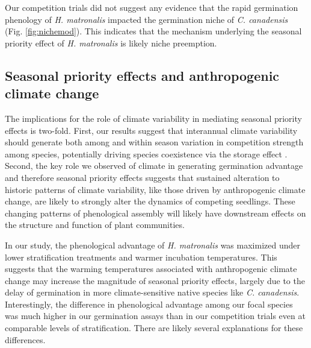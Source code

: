 \documentclass{article}[11pt]
\begin{document}
Our competition trials did not suggest any evidence that the rapid germination phenology of \textit{H. matronalis} impacted the germination niche of \textit{C. canadensis} (Fig. \ref{fig:nichemod}). This indicates that the mechanism underlying the seasonal priority effect of \textit{H. matronalis} is likely niche preemption.%

\subsection*{Seasonal priority effects and anthropogenic climate change}
The implications for the role of climate variability in mediating seasonal priority effects is two-fold. First, our results suggest that interannual climate variability should generate both among and within season variation in competition strength among species, potentially driving species coexistence via the storage effect \citep{Chesson:2003ve}. Second, the key role we observed of climate in generating germination advantage and therefore seasonal priority effects suggests that sustained alteration to historic patterns of climate variability, like those driven by anthropogenic climate change, are likely to strongly alter the dynamics of competing seedlings. These changing patterns of phenological assembly will likely have downstream effects on the structure and function of plant communities.

In our study, the phenological advantage of \textit{H. matronalis} was maximized under lower stratification treatments and warmer incubation temperatures. This suggests that the warming temperatures associated with anthropogenic climate change may increase the magnitude of seasonal priority effects, largely due to the delay of germination in more climate-sensitive native species like \textit{C. canadensis}. Interestingly, the difference in phenological advantage among our focal species was much higher in our germination assays than in our competition trials even at comparable levels of stratification. There are likely several explanations for these differences.
\end{document}
